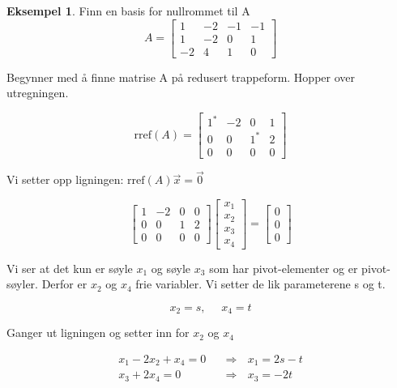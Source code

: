 \documentclass[11pt]{article}
\theoremstyle{definition}
\theoremstyle{definition}
\newtheorem{mitteks}{Eksempel}[section]
\theoremstyle{definition}
\theoremstyle{definition}
\theoremstyle{definition}
\theoremstyle{definition}
\begin{document}
		\begin{mitteks}
		Finn en basis for nullrommet til A
		\[A=\left[\begin{array}{rrrr} 
		1 & -2 & -1 & -1 \\
		1 & -2 & 0 & 1 \\
		-2 & 4 & 1 & 0 
		\end{array} \right]\]
		
		Begynner med å finne matrise A på redusert trappeform. Hopper over utregningen.
		
		\[\text{rref}(A)=\left[\begin{array}{rrrr} 
		1^{*} & -2 & 0 & 1 \\
		0 & 0 & 1^{*} & 2 \\
		0 & 0 & 0 & 0 
		\end{array} \right]\]
		
	    Vi setter opp ligningen: \(\text{rref}(A)\vec{x}=\vec{0}\)
		
		\[\left[\begin{array}{rrrr} 
		1 & -2 & 0 & 0 \\
		0 & 0 & 1 & 2 \\
		0 & 0 & 0 & 0 
		\end{array} \right] \left[\begin{array}{c} 
		x_1  \\
		x_2  \\
		x_3  \\
		x_4
		\end{array} \right]=
		\left[\begin{array}{rr} 
		0  \\
		0  \\
		0
		\end{array} \right] \]
		
		Vi ser at det kun er søyle \(x_1\) og søyle \(x_3\) som har pivot-elementer og er pivot-søyler. Derfor er \(x_2\) og \(x_4\) frie variabler. Vi setter de lik parameterene s og t.
		
		\[x_2=s,\hspace{16pt} x_4=t \]
		
		Ganger ut ligningen og setter inn for \(x_2\) og \(x_4\)
		
		\begin{align*}
		x_1-2x_2+x_4=0\hspace{8pt}&\Rightarrow \hspace{8pt}x_1=2s-t\\
		x_3+2x_4=0\hspace{8pt}&\Rightarrow\hspace{8pt} x_3=-2t
		\end{align*}
		

\end{mitteks}
\end{document}
